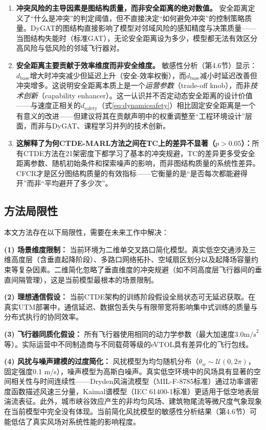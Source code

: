 \documentclass[12pt,a4paper,UTF8]{ctexart}
\begin{document}
\begin{enumerate}[label=(\arabic*)]
    \item \textbf{冲突风险的主导因素是图结构质量，而非安全距离的绝对数值。} 安全距离定义了``什么是冲突''的判定阈值，但不直接决定``如何避免冲突''的控制策略质量。DyGAT的图结构直接影响了模型对邻域风险的感知精度与决策质量——当图结构失能时（标准GAT），无论安全距离设为多少，模型都无法有效区分高风险与低风险的邻域飞行器对。
    \item \textbf{安全距离主要贡献于效率维度而非安全维度。} 敏感性分析（第4.6节）显示：$d_{\text{base}}$增大时冲突减少但延迟上升（安全-效率权衡），而$d_{\text{base}}$减小时延迟改善但冲突增多。这说明安全距离本质上是一个\emph{运营参数}（trade-off knob），而非\emph{技术创新}（capability enhancer）。这一认识并不否定动态安全距离的设计价值——与速度正相关的$d_{\text{safety}}$（式\ref{eq:dynamicsafety}）相比固定安全距离是一个有意义的改进——但建议将其在贡献声明中的权重调整至``工程环境设计''层面，而非与DyGAT、课程学习并列的技术创新。
    \item \textbf{这解释了为何CTDE-MARL方法之间在TC上的差异不显著（$p>0.05$）：}所有CTDE方法在21架密度下都学习了基本的冲突规避，TC的差异更多受安全距离参数、随机初始条件和探索噪声的影响，而非图结构质量的系统性差异。CFCR才是区分图结构质量的有效指标——它衡量的是``是否每次都能避得开''而非``平均避开了多少次''。
\end{enumerate}

\subsection{方法局限性}

本文方法存在以下局限性，需要在未来工作中解决：

\textbf{(1) 场景维度限制：} 当前环境为二维单交叉路口简化模型。真实低空交通涉及三维高度层（含垂直起降阶段）、多路口网络拓扑、空域扇区划分以及起降场容量约束等复杂因素。二维简化忽略了垂直维度的冲突规避（如不同高度层飞行器间的垂直间隔管理），这是当前模型最根本的场景限制。

\textbf{(2) 理想通信假设：} 当前CTDE架构的训练阶段假设全局状态可无延迟获取。在真实UTM部署中，通信延迟、数据包丢失与有限带宽将影响集中式训练的质量与分布式执行的协同效率。

\textbf{(3) 飞行器同质化假设：} 所有飞行器使用相同的动力学参数（最大加速度$3.0\text{m/s}^2$等）。实际运营中不同制造商与不同载荷等级的eVTOL具有差异化的飞行包线。

\textbf{(4) 风扰与噪声建模的过度简化：} 风扰模型为均匀随机分布（$\theta_w \sim \mathcal{U}(0, 2\pi)$，固定强度0.1 m/s），噪声模型为高斯白噪声。真实低空环境中的风场具有显著的空间相关性与时间连续性——Dryden风湍流模型（MIL-F-8785标准）通过功率谱密度函数描述风速三分量，Kaimal谱模型（IEC 61400-1标准）更适用于低空地表层湍流表征。此外，城市峡谷效应产生的非均匀风场、建筑物尾流等微尺度气象现象在当前模型中完全没有体现。当前简化风扰模型的敏感性分析结果（第4.6节）可能低估了真实风场对系统性能的影响程度。
\end{document}
